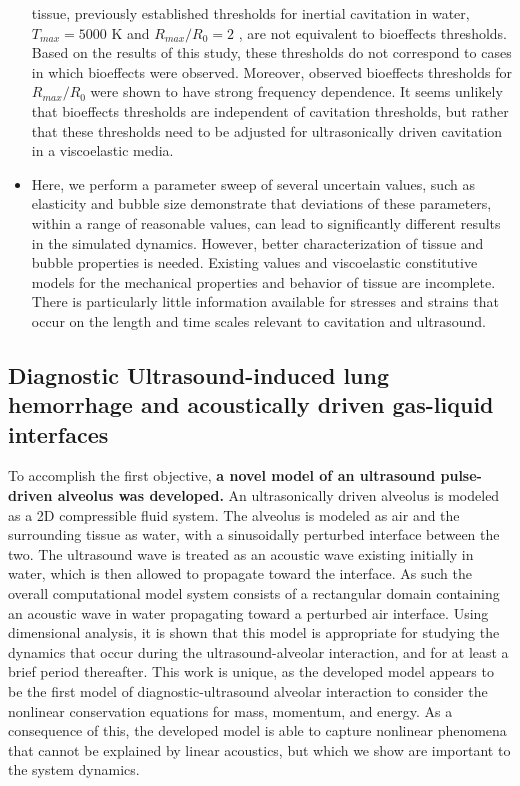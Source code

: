 \begin{itemize}
  tissue, previously established thresholds for inertial cavitation in
  water, $T_{max} = 5000$ K and $R_{max}/R_0 = 2$
  \citep{Apfel1991,Flynn1975a}, are not equivalent to bioeffects
  thresholds. Based on the results of this study, these thresholds do
  not correspond to cases in which bioeffects were observed. Moreover,
  observed bioeffects thresholds for $R_{max}/R_0$ were shown to have
  strong frequency dependence. It seems unlikely that bioeffects
  thresholds are independent of cavitation thresholds, but rather that
  these thresholds need to be adjusted for ultrasonically driven
  cavitation in a viscoelastic media.
\item Here, we perform a parameter sweep of several uncertain values,
  such as elasticity and bubble size demonstrate that deviations of
  these parameters, within a range of reasonable values, can lead to
  significantly different results in the simulated dynamics. However,
  better characterization of tissue and bubble properties is
  needed. Existing values and viscoelastic constitutive models for the
  mechanical properties and behavior of tissue are incomplete. There
  is particularly little information available for stresses and
  strains that occur on the length and time scales relevant to
  cavitation and ultrasound.
\end{itemize}

\subsection{Diagnostic Ultrasound-induced lung hemorrhage
  and acoustically driven gas-liquid interfaces}
To accomplish the first objective, \textbf{a novel model of an
  ultrasound pulse-driven alveolus was developed.} An ultrasonically
driven alveolus is modeled as a 2D compressible fluid system. The
alveolus is modeled as air and the surrounding tissue as water, with a
sinusoidally perturbed interface between the two. The ultrasound wave
is treated as an acoustic wave existing initially in water, which is
then allowed to propagate toward the interface. As such the overall
computational model system consists of a rectangular domain containing
an acoustic wave in water propagating toward a perturbed air
interface. Using dimensional analysis, it is shown that this model is
appropriate for studying the dynamics that occur during the
ultrasound-alveolar interaction, and for at least a brief period
thereafter. This work is unique, as the developed model appears to be
the first model of diagnostic-ultrasound alveolar interaction to
consider the nonlinear conservation equations for mass, momentum, and energy. As
a consequence of this, the developed model is able to capture
nonlinear phenomena that cannot be explained by linear acoustics, but
which we show are important to the system dynamics.


